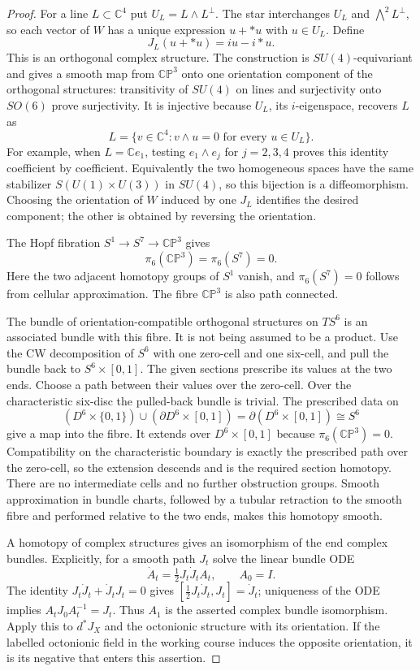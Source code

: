 \begin{proof}
For a line $L\subset\mathbb C^4$ put
$U_L=L\wedge L^\perp$. The star interchanges $U_L$ and
$\bigwedge^2L^\perp$, so each vector of $W$ has a unique expression
$u+*u$ with $u\in U_L$. Define
\[
                  J_L(u+*u)=iu-i*u.
\]
This is an orthogonal complex structure. The construction is
$SU(4)$-equivariant and gives a smooth map from $\mathbb{CP}^3$ onto
one orientation component of the orthogonal structures: transitivity
of $SU(4)$ on lines and surjectivity onto $SO(6)$ prove surjectivity.
It is injective because $U_L$, its $i$-eigenspace, recovers $L$ as
\[
 L=\{v\in\mathbb C^4: v\wedge u=0\text{ for every }u\in U_L\}.
\]
For example, when $L=\mathbb Ce_1$, testing $e_1\wedge e_j$ for
$j=2,3,4$ proves this identity coefficient by coefficient.
Equivalently the two homogeneous spaces have the same stabilizer
$S(U(1)\times U(3))$ in $SU(4)$, so this bijection is a
diffeomorphism. Choosing the orientation of $W$ induced by one
$J_L$ identifies the desired component; the other is obtained by
reversing the orientation.

The Hopf fibration $S^1\to S^7\to\mathbb{CP}^3$ gives
\[
             \pi_6(\mathbb{CP}^3)=\pi_6(S^7)=0.
\]
Here the two adjacent homotopy groups of $S^1$ vanish, and
$\pi_6(S^7)=0$ follows from cellular approximation. The fibre
$\mathbb{CP}^3$ is also path connected.

The bundle of orientation-compatible orthogonal structures on $TS^6$
is an associated bundle with this fibre. It is not being assumed to
be a product. Use the CW decomposition of $S^6$ with one zero-cell
and one six-cell, and pull the bundle back to $S^6\times[0,1]$.
The given sections prescribe its values at the two ends. Choose a
path between their values over the zero-cell. Over the characteristic
six-disc the pulled-back bundle is trivial. The prescribed data on
\[
 (D^6\times\{0,1\})\cup(\partial D^6\times[0,1])
                    =\partial(D^6\times[0,1])\cong S^6
\]
give a map into the fibre. It extends over $D^6\times[0,1]$ because
$\pi_6(\mathbb{CP}^3)=0$. Compatibility on the characteristic
boundary is exactly the prescribed path over the zero-cell, so the
extension descends and is the required section homotopy. There are
no intermediate cells and no further obstruction groups.
Smooth approximation in bundle charts, followed by a tubular
retraction to the smooth fibre and performed relative to the two
ends, makes this homotopy smooth.

A homotopy of complex structures gives an isomorphism of the end
complex bundles. Explicitly, for a smooth path $J_t$ solve the
linear bundle ODE
\[
 \dot A_t=\tfrac12J_t\dot J_t A_t,\qquad A_0=I.
\]
The identity $J_t\dot J_t+\dot J_tJ_t=0$ gives
$[\tfrac12J_t\dot J_t,J_t]=\dot J_t$; uniqueness of the ODE
implies $A_tJ_0A_t^{-1}=J_t$. Thus $A_1$ is the asserted complex
bundle isomorphism. Apply this to $d^*J_X$ and the octonionic
structure with its orientation. If the labelled octonionic field
in the working course induces the opposite orientation, it is its
negative that enters this assertion.
\end{proof}

